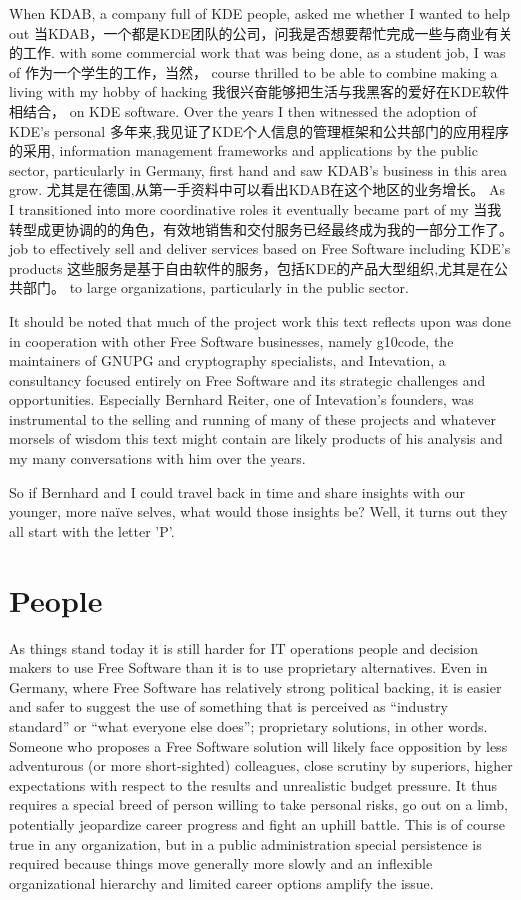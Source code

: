 When KDAB, a company full of KDE people, asked me whether I wanted to help out
当KDAB，一个都是KDE团队的公司，问我是否想要帮忙完成一些与商业有关的工作.
with some commercial work that was being done, as a student job, I was of
作为一个学生的工作，当然，
course thrilled to be able to combine making a living with my hobby of hacking
我很兴奋能够把生活与我黑客的爱好在KDE软件相结合，
on KDE software. Over the years I then witnessed the adoption of KDE's personal
多年来,我见证了KDE个人信息的管理框架和公共部门的应用程序的采用,
information management frameworks and applications by the public sector,
particularly in Germany, first hand and saw KDAB's business in this area grow.
尤其是在德国,从第一手资料中可以看出KDAB在这个地区的业务增长。
As I transitioned into more coordinative roles it eventually became part of my
当我转型成更协调的的角色，有效地销售和交付服务已经最终成为我的一部分工作了。
job to effectively sell and deliver services based on Free Software including KDE's products
这些服务是基于自由软件的服务，包括KDE的产品大型组织,尤其是在公共部门。
to large organizations, particularly in the public sector.

It should be noted that much of the project work this text reflects upon was done in
cooperation with other Free Software businesses, namely g10code, the
maintainers of GNUPG and cryptography specialists, and Intevation, a consultancy focused
entirely on Free Software and its strategic challenges and opportunities. Especially
Bernhard Reiter, one of Intevation's founders, was instrumental to the selling and
running of many of these projects and whatever morsels of wisdom this text might contain
are likely products of his analysis and my many conversations with him over the years.

So if Bernhard and I could travel back in time and share insights with our younger, more
naïve selves, what would those insights be? Well, it turns out they all start with the
letter 'P'.

\section*{People}

As things stand today it is still harder for IT operations people and decision
makers to use Free Software than it is to use proprietary alternatives. Even in
Germany, where Free Software has relatively strong political backing, it is
easier and safer to suggest the use of something that is perceived as ``industry
standard'' or ``what everyone else does''; proprietary solutions, in other words.
Someone who proposes a Free Software solution will likely face opposition by
less adventurous (or more short-sighted) colleagues, close scrutiny by
superiors, higher expectations with respect to the results and unrealistic
budget pressure. It thus requires a special breed of person willing to take
personal risks, go out on a limb, potentially jeopardize career progress and
fight an uphill battle. This is of course true in any organization, but in a
public administration special persistence is required because things move
generally more slowly and an inflexible organizational hierarchy and limited
career options amplify the issue.

